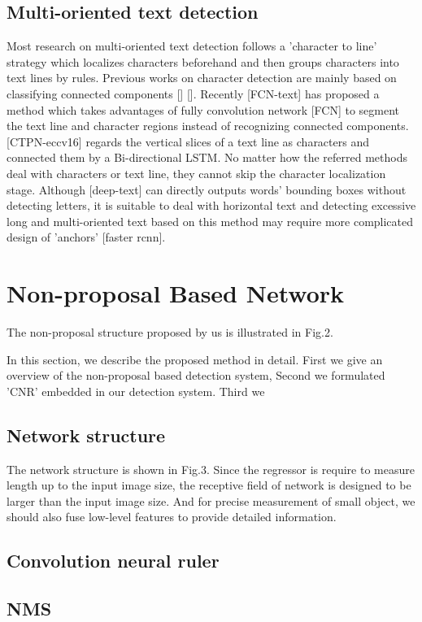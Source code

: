 \documentclass[10pt,twocolumn,letterpaper]{article}
\begin{document}
\subsection{Multi-oriented text detection}
Most research on multi-oriented text detection follows a 'character to line' strategy which localizes characters beforehand and then groups characters into text lines by rules. Previous works on character detection are mainly based on classifying connected components [] []. Recently [FCN-text] has proposed a method which takes advantages of fully convolution network [FCN] to segment the text line and character regions instead of recognizing connected components. [CTPN-eccv16] regards the vertical slices of a text line as characters and connected them by a Bi-directional LSTM. No matter how the referred methods deal with characters or text line, they cannot skip the character localization stage. Although [deep-text] can directly outputs words' bounding boxes without detecting letters, it is suitable to deal with horizontal text and detecting excessive long and multi-oriented text based on this method may require more complicated design of 'anchors' [faster rcnn].



\section{Non-proposal Based Network}
The non-proposal structure proposed by us is illustrated in Fig.2.

In this section, we describe the proposed method in detail. First we give an overview of the non-proposal based detection system, Second we formulated 'CNR' embedded in our detection system. Third we 

\subsection{Network structure}
The network structure is shown in Fig.3. Since the regressor is require to measure length up to the input image size, the receptive field of network is designed to be larger than the input image size. And for precise measurement of small object, we should also fuse low-level features to provide detailed information. 
\subsection{Convolution neural ruler}

\subsection{NMS}
\end{document}
